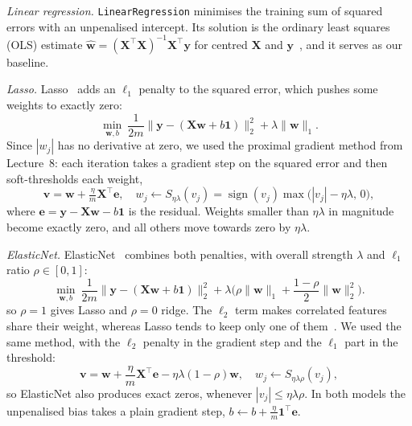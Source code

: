 \documentclass[conference]{IEEEtran}
\DeclareMathOperator{\sign}{sign}
\newcommand{\vect}[1]{\mathbf{#1}}
\begin{document}
\textit{Linear regression.} \texttt{LinearRegression} minimises the training sum of squared errors with an unpenalised intercept. Its solution is the ordinary least squares (OLS) estimate $\hat{\vect{w}}=(\vect{X}^\top\vect{X})^{-1}\vect{X}^\top\vect{y}$ for centred $\vect{X}$ and $\vect{y}$~\cite{notes}, and it serves as our baseline.

\textit{Lasso.} Lasso~\cite{tibshirani} adds an $\ell_1$ penalty to the squared error, which pushes some weights to exactly zero:
\begin{equation}
\min_{\vect{w},b}\ \frac{1}{2m}\|\vect{y}-(\vect{X}\vect{w}+b\vect{1})\|_2^2+\lambda\|\vect{w}\|_1 .
\label{eq:lasso}
\end{equation}
Since $|w_j|$ has no derivative at zero, we used the proximal gradient method from Lecture~8: each iteration takes a gradient step on the squared error and then soft-thresholds each weight,
\begin{equation}
\vect{v}=\vect{w}+\tfrac{\eta}{m}\vect{X}^\top\vect{e},\quad w_j\leftarrow S_{\eta\lambda}(v_j)=\sign(v_j)\max\big(|v_j|-\eta\lambda,\,0\big),
\label{eq:soft}
\end{equation}
where $\vect{e}=\vect{y}-\vect{X}\vect{w}-b\vect{1}$ is the residual. Weights smaller than $\eta\lambda$ in magnitude become exactly zero, and all others move towards zero by $\eta\lambda$.

\textit{ElasticNet.} ElasticNet~\cite{zou} combines both penalties, with overall strength $\lambda$ and $\ell_1$ ratio $\rho\in[0,1]$:
\begin{equation}
\min_{\vect{w},b}\ \frac{1}{2m}\|\vect{y}-(\vect{X}\vect{w}+b\vect{1})\|_2^2+\lambda\Big(\rho\|\vect{w}\|_1+\frac{1-\rho}{2}\|\vect{w}\|_2^2\Big) .
\label{eq:enet}
\end{equation}
so $\rho=1$ gives Lasso and $\rho=0$ ridge. The $\ell_2$ term makes correlated features share their weight, whereas Lasso tends to keep only one of them~\cite{notes}. We used the same method, with the $\ell_2$ penalty in the gradient step and the $\ell_1$ part in the threshold:
\begin{equation}
\vect{v}=\vect{w}+\frac{\eta}{m}\vect{X}^\top\vect{e}-\eta\lambda(1-\rho)\vect{w},\quad w_j\leftarrow S_{\eta\lambda\rho}(v_j),
\label{eq:enet-update}
\end{equation}
so ElasticNet also produces exact zeros, whenever $|v_j|\le\eta\lambda\rho$. In both models the unpenalised bias takes a plain gradient step, $b\leftarrow b+\frac{\eta}{m}\vect{1}^\top\vect{e}$.
\end{document}
